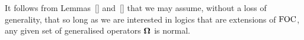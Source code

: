 \documentclass[../main/thesis.tex]{subfiles}
\begin{document}
It follows from Lemmas~\ref{} and~\ref{} that we may assume, without a loss of
generality, that so long as we are interested in logics that are extensions of
$\text{\upshape FOC}$, any given set of generalised operators $\mathbf{\mathbf{\Omega}}$ is normal.









\end{document}
